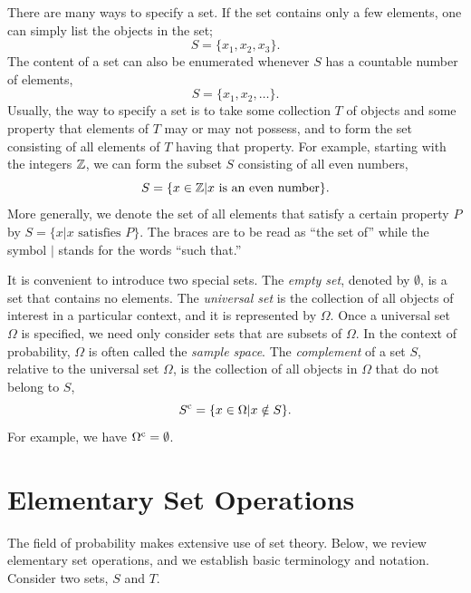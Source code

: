 There are many ways to specify a set.
If the set contains only a few elements, one can simply list the objects in the set;
\begin{equation*}
S = \{ x_1, x_2, x_3 \} .
\end{equation*}
The content of a set can also be enumerated whenever $S$ has a countable number of elements,
\begin{equation*}
S = \{ x_1, x_2, \ldots \} .
\end{equation*}
Usually, the way to specify a set is to take some collection $T$ of objects and some property that elements of $T$ may or may not possess, and to form the set consisting of all elements of $T$ having that property.
For example, starting with the integers $\mathbb{Z}$, we can form the subset $S$ consisting of all even numbers,
\begin{equation*}
S = \{ x \in \mathbb{Z} | x \text{ is an even number} \}.
\end{equation*}
More generally, we denote the set of all elements that satisfy a certain property $P$ by $S = \{ x | x \text{ satisfies } P \}$.
The braces are to be read as ``the set of'' while the symbol $|$ stands for the words ``such that.''

It is convenient to introduce two special sets.
The \emph{empty set}, denoted by $\emptyset$, is a set that contains no elements.
The \emph{universal set} is the collection of all objects of interest in a particular context, and it is represented by $\Omega$.
Once a universal set $\Omega$ is specified, we need only consider sets that are subsets of $\Omega$.
In the context of probability, $\Omega$ is often called the \emph{sample space}.
The \emph{complement} of a set $S$, relative to the universal set $\Omega$, is the collection of all objects in $\Omega$ that do not belong to $S$,
\begin{equation*}
S^{\mathrm{c}} = \{ x \in \Omega | x \notin S \}.
\end{equation*}
For example, we have $\Omega^{\mathrm{c}} = \emptyset$.


\section{Elementary Set Operations}

The field of probability makes extensive use of set theory.
Below, we review elementary set operations, and we establish basic terminology and notation.
Consider two sets, $S$ and $T$.

